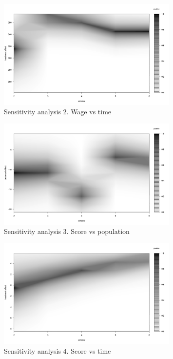 \documentclass{article}
\begin{document}
\begin{figure}[H]
    \centering
    \includegraphics[width=0.8\textwidth]{figures/q1_sensitivity_2.png}
    \caption{Sensitivity analysis 2. Wage vs time}
    \label{fig:q1_sensitivity_2}
\end{figure}

\begin{figure}[H]
    \centering
    \includegraphics[width=0.8\textwidth]{figures/q1_sensitivity_3.png}
    \caption{Sensitivity analysis 3. Score vs population}
    \label{fig:q1_sensitivity_3}
\end{figure}

\begin{figure}[H]
    \centering
    \includegraphics[width=0.8\textwidth]{figures/q1_sensitivity_4.png}
    \caption{Sensitivity analysis 4. Score vs time}
    \label{fig:q1_sensitivity_4}
\end{figure}
\end{document}
